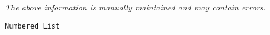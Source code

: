 \label{pkg:red\_black\_numbered\_list}

{\tiny \it The above information is manually maintained and may contain errors.}
\begin{verbatim}
Numbered_List
\end{verbatim}
